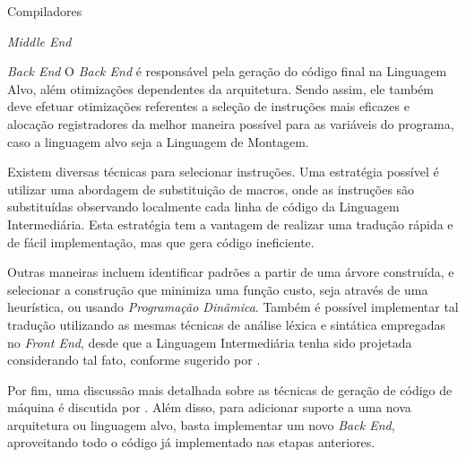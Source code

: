 \begin{section}{Compiladores}
\begin{subsection}{\textit{Middle End}}
\end{subsection}

\begin{subsection}{\textit{Back End}}
    O \textit{Back End} é responsável pela geração do código final na
Linguagem Alvo, além otimizações dependentes
da arquitetura. Sendo assim, ele também deve efetuar otimizações referentes
a seleção de instruções mais eficazes e alocação registradores
da melhor maneira possível para as variáveis do programa, caso a linguagem alvo
seja a Linguagem de Montagem.

    Existem diversas técnicas para selecionar instruções. Uma estratégia possível
é utilizar uma abordagem de substituição de macros, onde as instruções são substituídas
observando localmente cada linha de código da Linguagem Intermediária. Esta estratégia
tem a vantagem de realizar uma tradução rápida e de fácil implementação, mas que gera
código ineficiente.

Outras maneiras incluem identificar padrões a partir de uma árvore
construída, e selecionar a construção que minimiza uma função custo, seja através de uma
heurística, ou usando \textit{Programação Dinâmica}. 
Também é possível implementar tal tradução utilizando as mesmas técnicas de
análise léxica e sintática empregadas no \textit{Front End}, desde que a
Linguagem Intermediária tenha sido projetada considerando tal fato, conforme
sugerido por \cite{glanville1978}. 

Por fim, uma discussão mais detalhada sobre
as técnicas de geração de código de máquina é discutida por
\cite{blindell2016instruction}. Além disso, para 
 adicionar suporte a uma nova arquitetura ou linguagem
alvo, basta implementar um novo \textit{Back End}, aproveitando todo
o código já implementado nas etapas anteriores.
\end{subsection}


\end{section}


